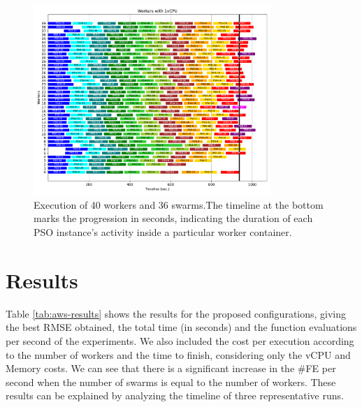 \documentclass{cys}
\begin{document}
\begin{figure}[h]
\centering
\includegraphics[width=0.8\textwidth]{plotW40P36}
\caption{Execution of 40 workers and 36 swarms.The timeline at the bottom marks 
the progression in seconds, indicating the duration of each PSO instance's activity 
inside a particular worker container.}
\label{fig:40w36s}
\end{figure}

\section{Results}
\label{sec:results}

Table \ref{tab:aws-results} shows the results for the proposed 
configurations, giving the best RMSE obtained, the total time 
(in seconds) and the function evaluations per second of the experiments.
We also included the cost per execution according to the number of 
workers and the time to finish, considering only the vCPU and Memory costs. 
We can see that there is a significant increase in the \#FE per second when the 
number of swarms is equal to the number of workers. 
These results can be explained by analyzing the timeline of three representative runs. 
\end{document}
